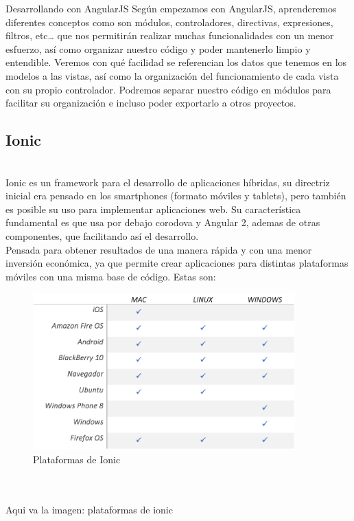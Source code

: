 \documentclass[a4paper, 11pt]{article}
\begin{document}
\begin{itemize}
            Desarrollando con AngularJS
            Según empezamos con AngularJS, aprenderemos diferentes conceptos como son
            módulos, controladores, directivas, expresiones, filtros, etc… que nos
            permitirán realizar muchas funcionalidades con un menor esfuerzo, así como
            organizar nuestro código y poder mantenerlo limpio y entendible. Veremos
            con qué facilidad se referencian los datos que tenemos en los modelos a
            las vistas, así como la organización del funcionamiento de cada vista con
            su propio controlador. Podremos separar nuestro código en módulos para
            facilitar su organización e incluso poder exportarlo a otros proyectos.


        \subsection{Ionic}\\

            Ionic es un framework para el desarrollo de aplicaciones híbridas,
            su directriz inicial era pensado en los smartphones (formato móviles y
            tablets), pero también es posible su uso para implementar aplicaciones
            web. Su característica fundamental es que usa por debajo corodova y
            Angular 2, ademas de otras componentes, que facilitando así el
            desarrollo.\\

            Pensada para obtener resultados de una manera rápida y con una menor
            inversión económica, ya que permite crear aplicaciones para distintas
            plataformas móviles con una misma base de código. Estas son:\\

                      \begin{figure}[H]
                        \centering
                        \includegraphics[width=0.9\textwidth]{tablaPlataformasIonic}
                        \caption{Plataformas de Ionic}
                        \label{f:plataformas}
                      \end{figure}
                      \\\\\textcolor[rgb]{1,0,0}{Aqui va la imagen: plataformas de ionic}\\\\


\end{itemize}
\end{document}
